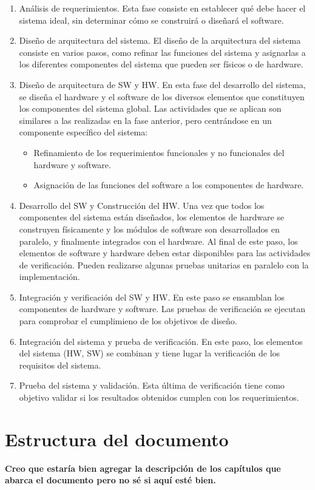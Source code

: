 \begin{enumerate}
	\item Análisis de requerimientos. Esta fase consiste en establecer qué debe hacer el sistema ideal, sin determinar cómo se construirá o diseñará el software. 
	\item Diseño de arquitectura del sistema. El diseño de la arquitectura del sistema consiste en varios pasos, como refinar las funciones del sistema y asignarlas a los diferentes componentes del sistema que pueden ser físicos o de hardware.
	\item Diseño de arquitectura de SW y HW. En esta fase del desarrollo del sistema, se diseña el hardware y el software de los diversos elementos que constituyen los componentes del sistema global. Las actividades que se aplican son similares a las realizadas en la fase anterior, pero centrándose en un componente específico del sistema: 
		\begin{itemize}
			\item Refinamiento de los requerimientos funcionales y no funcionales del hardware y software.
			\item Asignación de las funciones del software a los componentes de hardware.
		\end{itemize}
	\item Desarrollo del SW y Construcción del HW. Una vez que todos los componentes del sistema están diseñados, los elementos de hardware se construyen físicamente y los módulos de software son desarrollados en paralelo, y finalmente integrados con el hardware. Al final de este paso, los elementos de software y hardware deben estar disponibles para las actividades de verificación. Pueden realizarse algunas pruebas unitarias en paralelo con la implementación.
	\item Integración y verificación del SW y HW. En este paso se ensamblan los componentes de hardware y software. Las pruebas de verificación se ejecutan para comprobar el cumplimieno de los objetivos de diseño.
	\item Integración del sistema y prueba de verificación. En este paso, los elementos del sistema (HW, SW) se combinan y tiene lugar la verificación de los requisitos del sistema. 
	\item Prueba del sistema y validación. Esta última de verificación tiene como objetivo validar si los resultados obtenidos cumplen con los requerimientos.
\end{enumerate}

\section{Estructura del documento}
	\textbf{Creo que estaría bien agregar la descripción de los capítulos que abarca el documento pero no sé si aquí esté bien.}
